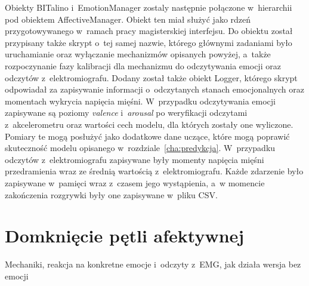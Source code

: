 Obiekty BITalino i~EmotionManager zostaly następnie połączone w~hierarchii pod obiektem AffectiveManager. Obiekt ten miał służyć jako rdzeń przygotowywanego w~ramach pracy magisterskiej interfejsu. Do obiektu został przypisany także skrypt o~tej samej nazwie, którego głównymi zadaniami było uruchamianie oraz wyłączanie mechanizmów opisanych powyżej, a~także rozpoczynanie fazy kalibracji dla mechanizmu do odczytywania emocji oraz odczytów z~elektromiografu. Dodany został także obiekt Logger, którego skrypt odpowiadał za zapisywanie informacji o~odczytanych stanach emocjonalnych oraz momentach wykrycia napięcia mięśni. W~przypadku odczytywania emocji zapisywane są poziomy \textit{valence} i~\textit{arousal} po weryfikacji odczytami z~akcelerometru oraz wartości cech modelu, dla których zostały one wyliczone. Pomiary te mogą posłużyć jako dodatkowe dane uczące, które mogą poprawić skuteczność modelu opisanego w~rozdziale~\ref{cha:predykcja}. W~przypadku odczytów z~elektromiografu zapisywane były momenty napięcia mięśni przedramienia wraz ze średnią wartością z~elektromiografu. Każde zdarzenie było zapisywane w~pamięci wraz z~czasem jego wystąpienia, a~w momencie zakończenia rozgrywki były one zapisywane w~pliku CSV.

\section{Domknięcie pętli afektywnej}
Mechaniki, reakcja na konkretne emocje i~odczyty z~EMG, jak działa wersja bez emocji